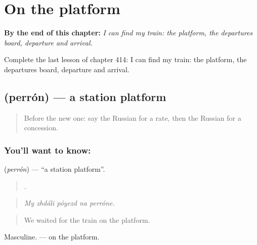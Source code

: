 
\chapter{On the platform}
\label{ch:ru-on-the-platform}

\begin{chapteropening}
\textbf{By the end of this chapter:} \emph{I can find my train: the platform, the departures board, departure and arrival.}

Complete the last lesson of chapter 414: I can find my train: the platform, the departures board, departure and arrival.
\end{chapteropening}

\section[\texorpdfstring{\ru{перрон} (perrón)}{перрон (perrón)}]{ (perrón) — a station platform}

\label{lesson:RU-C414-perron}



\begin{quote}
Before the new one: say the Russian for a rate, then the Russian for a concession.
\end{quote}

\subsection*{You'll want to know: }
\textbf{} (\emph{perrón}) — \textquotedblleft{}a station platform\textquotedblright{}.

\begin{quote}
    .
\end{quote}

\begin{quote}
\emph{My zhdáli póyezd na perróne.}
\end{quote}

\begin{quote}
We waited for the train on the platform.
\end{quote}

Masculine. \emph{ } — on the platform.

